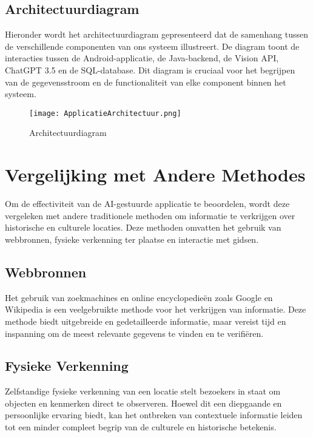 \pagebreak

\subsection{Architectuurdiagram}

Hieronder wordt het architectuurdiagram gepresenteerd dat de samenhang tussen de verschillende componenten van ons systeem illustreert. De diagram toont de interacties tussen de Android-applicatie, de Java-backend, de Vision API, ChatGPT 3.5 en de SQL-database. Dit diagram is cruciaal voor het begrijpen van de gegevensstroom en de functionaliteit van elke component binnen het systeem.


\begin{figure}[ht]
    \centering
    \texttt{[image: ApplicatieArchitectuur.png]}
    \caption{Architectuurdiagram}
    \label{fig:example}
\end{figure}

\section{Vergelijking met Andere Methodes}
Om de effectiviteit van de AI-gestuurde applicatie te beoordelen, wordt deze vergeleken met andere traditionele methoden om informatie te verkrijgen over historische en culturele locaties. Deze methoden omvatten het gebruik van webbronnen, fysieke verkenning ter plaatse en interactie met gidsen.

\subsection{Webbronnen}
Het gebruik van zoekmachines en online encyclopedieën zoals Google en Wikipedia is een veelgebruikte methode voor het verkrijgen van informatie. Deze methode biedt uitgebreide en gedetailleerde informatie, maar vereist tijd en inspanning om de meest relevante gegevens te vinden en te verifiëren.

\subsection{Fysieke Verkenning}
Zelfstandige fysieke verkenning van een locatie stelt bezoekers in staat om objecten en kenmerken direct te observeren. Hoewel dit een diepgaande en persoonlijke ervaring biedt, kan het ontbreken van contextuele informatie leiden tot een minder compleet begrip van de culturele en historische betekenis.

